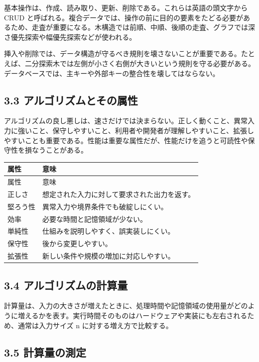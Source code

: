 \documentclass[a4paper,11pt]{ltjsarticle}
\begin{document}
基本操作は、作成、読み取り、更新、削除である。これらは英語の頭文字から CRUD と呼ばれる。複合データでは、操作の前に目的の要素をたどる必要があるため、走査が重要になる。木構造では前順、中順、後順の走査、グラフでは深さ優先探索や幅優先探索などが使われる。

挿入や削除では、データ構造が守るべき規則を壊さないことが重要である。たとえば、二分探索木では左側が小さく右側が大きいという規則を守る必要がある。データベースでは、主キーや外部キーの整合性を壊してはならない。

\subsection{3.3 アルゴリズムとその属性}

アルゴリズムの良し悪しは、速さだけでは決まらない。正しく動くこと、異常入力に強いこと、保守しやすいこと、利用者や開発者が理解しやすいこと、拡張しやすいことも重要である。性能は重要な属性だが、性能だけを追うと可読性や保守性を損なうことがある。

\begin{longtable}{>{\raggedright\arraybackslash}p{}>{\raggedright\arraybackslash}p{}}
\toprule
属性 & 意味 \\
\midrule
\endfirsthead
\toprule
属性 & 意味 \\
\midrule
\endhead
正しさ & 想定された入力に対して要求された出力を返す。 \\
堅ろう性 & 異常入力や境界条件でも破綻しにくい。 \\
効率 & 必要な時間と記憶領域が少ない。 \\
単純性 & 仕組みを説明しやすく、誤実装しにくい。 \\
保守性 & 後から変更しやすい。 \\
拡張性 & 新しい条件や規模の増加に対応しやすい。 \\
\bottomrule
\end{longtable}

\subsection{3.4 アルゴリズムの計算量}

計算量は、入力の大きさが増えたときに、処理時間や記憶領域の使用量がどのように増えるかを表す。実行時間そのものはハードウェアや実装にも左右されるため、通常は入力サイズ n に対する増え方で比較する。

\subsection{3.5 計算量の測定}
\end{document}
